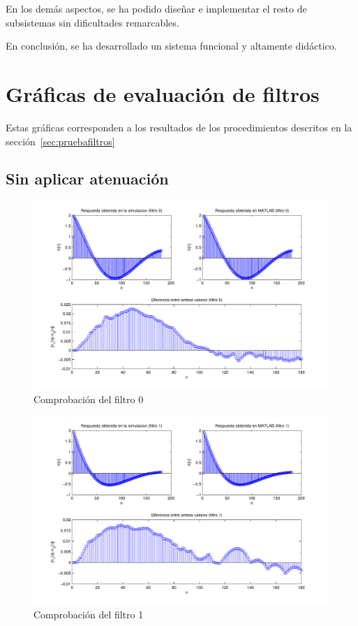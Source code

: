 \documentclass[a4paper,12pt]{article}
\begin{document}
En los demás aspectos, se ha podido diseñar e implementar el resto de subsistemas sin dificultades remarcables.

En conclusión, se ha desarrollado un sistema funcional y altamente didáctico.

\appendix
\clearpage
\addappheadtotoc
\appendixpage
\section{Gráficas de evaluación de filtros}\label{sec:resultadosfiltros}
Estas gráficas corresponden a los resultados de los procedimientos descritos en la sección~\ref{sec:pruebafiltros}
\subsection{Sin aplicar atenuación}
\begin{figure}[hbt]
\includegraphics[width=\textwidth]{img/respfiltro0.pdf} 
\caption{Comprobación del filtro 0} \label{fig:filter0}
\end{figure}

\begin{figure}[hbt]
\includegraphics[width=\textwidth]{img/respfiltro1.pdf} 
\caption{Comprobación del filtro 1} \label{fig:filter1}
\end{figure}
\end{document}

